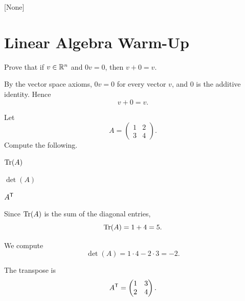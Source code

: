 \documentclass[11pt]{article}
\begin{document}
[None]

\makehwtitle

\section{Linear Algebra Warm-Up}

\begin{problem}
    Prove that if $v \in \mathbb{R}^n$ and $0v = 0$, then $v + 0 = v$.
\end{problem}

\begin{solution}
    By the vector space axioms, $0v = 0$ for every vector $v$, and $0$ is the additive identity.
    Hence
    \[
        v + 0 = v.
    \]
\end{solution}

\begin{problem}
    Let
    \[
        A = \begin{pmatrix}1 & 2\\ 3 & 4\end{pmatrix}.
    \]
    Compute the following.
    \begin{subproblem}
        \item $\operatorname{Tr}(A)$
        \item $\det(A)$
        \item $A^{\mathsf{T}}$
    \end{subproblem}
\end{problem}

\begin{solution}
    \begin{subproblem}
        \item Since $\operatorname{Tr}(A)$ is the sum of the diagonal entries,
        \[
            \operatorname{Tr}(A) = 1+4=5.
        \]
        \item We compute
        \[
            \det(A)=1\cdot 4 - 2\cdot 3 = -2.
        \]
        \item The transpose is
        \[
            A^{\mathsf{T}} = \begin{pmatrix}1 & 3\\ 2 & 4\end{pmatrix}.
        \]
    \end{subproblem}
\end{solution}
\end{document}
